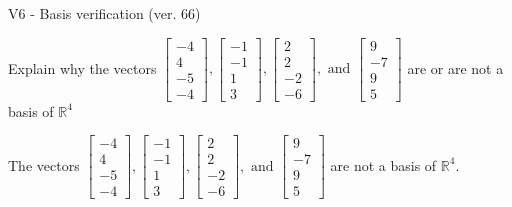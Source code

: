 \begin{exercise}
  \begin{exerciseTitle}V6 - Basis verification (ver. 66)\end{exerciseTitle}
  \begin{exerciseStatement}
    Explain why the vectors \(\left[\begin{array}{r}
-4 \\
4 \\
-5 \\
-4
\end{array}\right] , \left[\begin{array}{r}
-1 \\
-1 \\
1 \\
3
\end{array}\right] , \left[\begin{array}{r}
2 \\
2 \\
-2 \\
-6
\end{array}\right] , \text{ and } \left[\begin{array}{r}
9 \\
-7 \\
9 \\
5
\end{array}\right]\) are or are not a basis of \(\mathbb{R}^4\)	


  \end{exerciseStatement}
  \begin{exerciseAnswer}
   The vectors \(\left[\begin{array}{r}
-4 \\
4 \\
-5 \\
-4
\end{array}\right] , \left[\begin{array}{r}
-1 \\
-1 \\
1 \\
3
\end{array}\right] , \left[\begin{array}{r}
2 \\
2 \\
-2 \\
-6
\end{array}\right] , \text{ and } \left[\begin{array}{r}
9 \\
-7 \\
9 \\
5
\end{array}\right]\) 
  	 are not  a basis of \(\mathbb{R}^4\).
  


  \end{exerciseAnswer}
\end{exercise}